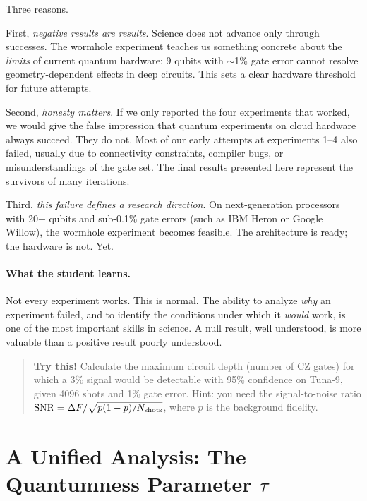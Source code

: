 \documentclass[amsmath,amssymb,reprint,aps,prb]{revtex4-2}
\begin{document}
Three reasons.

First, \emph{negative results are results}.  Science does not
advance only through successes.  The wormhole experiment teaches us
something concrete about the \emph{limits} of current quantum
hardware: 9 qubits with $\sim$1\% gate error cannot resolve
geometry-dependent effects in deep circuits.  This sets a clear
hardware threshold for future attempts.

Second, \emph{honesty matters}.  If we only reported the four
experiments that worked, we would give the false impression that
quantum experiments on cloud hardware always succeed.  They do not.
Most of our early attempts at experiments 1--4 also failed,
usually due to connectivity constraints, compiler bugs, or
misunderstandings of the gate set.  The final results presented
here represent the survivors of many iterations.

Third, \emph{this failure defines a research direction}.  On
next-generation processors with 20+ qubits and sub-0.1\% gate
errors (such as IBM Heron or Google Willow), the wormhole
experiment becomes feasible.  The architecture is ready; the
hardware is not.  Yet.

\paragraph{What the student learns.}
Not every experiment works.  This is normal.  The ability to
analyze \emph{why} an experiment failed, and to identify the
conditions under which it \emph{would} work, is one of the most
important skills in science.  A null result, well understood, is
more valuable than a positive result poorly understood.

\begin{quote}
\textbf{Try this!}  Calculate the maximum circuit depth (number of
CZ gates) for which a 3\% signal would be detectable with
95\% confidence on Tuna-9, given 4096 shots and 1\% gate error.
Hint: you need the signal-to-noise ratio
$\text{SNR} = \Delta F / \sqrt{p(1-p)/N_{\rm shots}}$, where
$p$ is the background fidelity.
\end{quote}


\section{A Unified Analysis: The Quantumness Parameter $\tau$}
\label{sec:tau}
\end{document}
